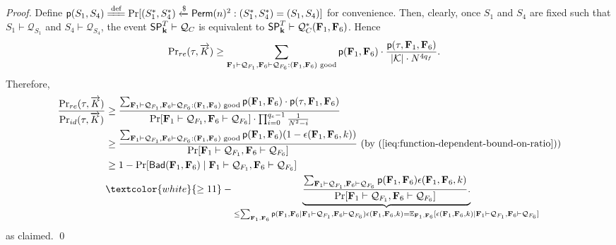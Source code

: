 \begin{proof}
	Define
	$\mathsf{p}(S_1,S_4)\xlongequal{\text{def}}\Pr[(S_1^*,S_4^*)\xleftarrow{\$}\mathsf{Perm}(n)^2:(S_1^*,S_4^*)=(S_1,S_4)]$ for convenience. Then, clearly, once $S_1$ and $S_4$ are fixed
	such that $S_1\vdash\mathcal{Q}_{S_1}$ and
	$S_4\vdash\mathcal{Q}_{S_4}$, the event
	$\mathsf{SP}_{\mathbf{k}}^T\vdash\mathcal{Q}_C$ is
	equivalent to
	$\mathsf{SP}_{\mathbf{k}}^T\vdash\mathcal{Q}_C^*(\mathbf{F}_1,\mathbf{F}_6)$.
	Hence
	\begin{align*}
	{{\Pr}_{re}(\tau,\ensuremath{\overrightarrow{K}})}
	&  \geq\sum_{\mathbf{F}_1\vdash\mathcal{Q}_{F_1},\mathbf{F}_6\vdash\mathcal{Q}_{F_6}
		:(\mathbf{F}_1,\mathbf{F}_6)\text{ good}} \textsf{p}(\mathbf{F}_1,\mathbf{F}_6) \cdot
	\frac{\textsf{p}(\tau,\mathbf{F}_1,\mathbf{F}_6)}{|\mathcal{K}|\cdot N^{4q_f}}  .
	\end{align*}
	Therefore,
	\begin{align*}
	\frac{{{\Pr}_{re}(\tau,\kvector)}}{{{\Pr}_{id}(\tau,\kvector)}}
	&  \geq \frac{\sum_{\mathbf{F}_1\vdash\mathcal{Q}_{F_1},\mathbf{F}_6\vdash\mathcal{Q}_{F_6}
			:(\mathbf{F}_1,\mathbf{F}_6)\text{ good}} \textsf{p}(\mathbf{F}_1,\mathbf{F}_6) \cdot
		\textsf{p}(\tau,\mathbf{F}_1,\mathbf{F}_6)}{   \Pr[\mathbf{F}_1\vdash\mathcal{Q}_{F_1},\mathbf{F}_6\vdash\mathcal{Q}_{F_6}]
		\cdot \prod_{i=0}^{q_e-1}\frac{1}{N^2-i}   }     \\
	&  \geq   \frac{\sum_{\mathbf{F}_1\vdash\mathcal{Q}_{F_1},\mathbf{F}_6\vdash\mathcal{Q}_{F_6}
			:(\mathbf{F}_1,\mathbf{F}_6)\text{ good}} \textsf{p}(\mathbf{F}_1,\mathbf{F}_6)  (1-\epsilon(\mathbf{F}_1,\mathbf{F}_6,k))}{\Pr[\mathbf{F}_1\vdash\mathcal{Q}_{F_1},\mathbf{F}_6\vdash\mathcal{Q}_{F_6}]} \text{ } (\text{by }(\ref{ieq:function-dependent-bound-on-ratio}))      \\
	&  \geq 	 1-\Pr[\textsf{Bad}(\mathbf{F}_1,\mathbf{F}_6)\mid
	\mathbf{F}_1\vdash\mathcal{Q}_{F_1},\mathbf{F}_6\vdash\mathcal{Q}_{F_6}]      \\
	& \textcolor{white}{\geq11} -\underbrace{  \frac{\sum_{\mathbf{F}_1\vdash\mathcal{Q}_{F_1},\mathbf{F}_6\vdash\mathcal{Q}_{F_6}} \textsf{p}(\mathbf{F}_1,\mathbf{F}_6) \epsilon(\mathbf{F}_1,\mathbf{F}_6,k)}{\Pr[\mathbf{F}_1\vdash\mathcal{Q}_{F_1},\mathbf{F}_6\vdash\mathcal{Q}_{F_6}]}.}_{\leq\sum_{\mathbf{F}_1,\mathbf{F}_6}\textsf{p}(\mathbf{F}_1,\mathbf{F}_6\mid\mathbf{F}_1\vdash\mathcal{Q}_{F_1},\mathbf{F}_6\vdash\mathcal{Q}_{F_6})\epsilon(\mathbf{F}_1,\mathbf{F}_6,k)= \mathbb{E}_{\mathbf{F}_1,\mathbf{F}_6}[\epsilon(\mathbf{F}_1,\mathbf{F}_6,k)\mid
		\mathbf{F}_1\vdash\mathcal{Q}_{F_1},\mathbf{F}_6\vdash\mathcal{Q}_{F_6}]} 
	\end{align*}
	as claimed.         \qed
\end{proof}




